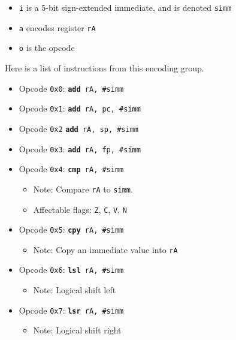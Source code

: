 \documentclass{article}
\begin{document}
	\singlespacing
	\begin{itemize}
		\item \texttt{i} is a 5-bit sign-extended immediate, and is denoted
		\texttt{simm}
		\item \texttt{a} encodes register \texttt{rA}
		\item \texttt{o} is the opcode
	\end{itemize}
	\doublespacing

	Here is a list of instructions from this encoding group.

	\singlespacing
	\begin{itemize}
		\item Opcode \texttt{0x0}:
			\texttt{\textbf{add} rA, \#simm}
		\item Opcode \texttt{0x1}:
			\texttt{\textbf{add} rA, pc, \#simm}
		\item Opcode \texttt{0x2}
			\texttt{\textbf{add} rA, sp, \#simm}
		\item Opcode \texttt{0x3}:
			\texttt{\textbf{add} rA, fp, \#simm}
		\item Opcode \texttt{0x4}:
			\texttt{\textbf{cmp} rA, \#simm}
		\begin{itemize}
			\item Note:  Compare \texttt{rA} to \texttt{simm}.
			\item Affectable flags:
				\texttt{Z}, \texttt{C}, \texttt{V}, \texttt{N}
		\end{itemize}
		\item Opcode \texttt{0x5}:
			\texttt{\textbf{cpy} rA, \#simm}
		\begin{itemize}
			\item Note:  Copy an immediate value into \texttt{rA}
		\end{itemize}
		\item Opcode \texttt{0x6}:
			\texttt{\textbf{lsl} rA, \#simm}
		\begin{itemize}
			\item Note:  Logical shift left
		\end{itemize}
		\item Opcode \texttt{0x7}:
			\texttt{\textbf{lsr} rA, \#simm}
		\begin{itemize}
			\item Note:  Logical shift right

\end{itemize}
\end{itemize}
\end{document}
